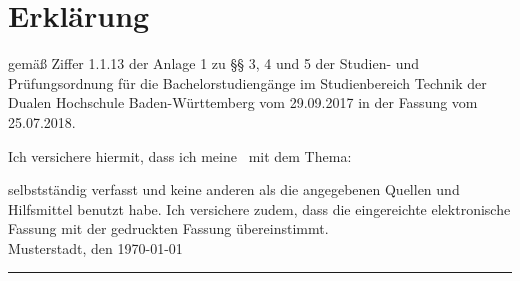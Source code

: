 %
%
%
%

\chapter*{Erklärung} %

gemäß Ziffer 1.1.13 der Anlage 1 zu §§ 3, 4 und 5  der Studien- und Prüfungsordnung für die Bachelorstudiengänge im Studienbereich Technik der Dualen Hochschule Baden-Württemberg vom 29.09.2017 in der Fassung vom 25.07.2018.

Ich versichere hiermit, dass ich meine \arbeit\ mit dem Thema:

\begin{quote}
	\textit{\titel} %
\end{quote}

selbstständig verfasst und keine anderen als die angegebenen Quellen und Hilfsmittel benutzt habe. Ich versichere zudem, dass die eingereichte elektronische Fassung mit der gedruckten Fassung übereinstimmt.\\[6ex]

Musterstadt, den \today \\[1ex]

\rule[-0.2cm]{5cm}{0.5pt} \\

\autor \\[10ex]

\rmfamily

\thispagestyle{empty}

\cleardoublepage

